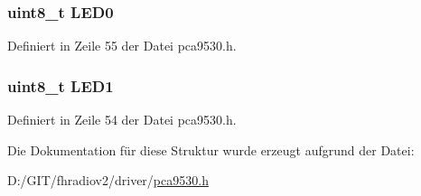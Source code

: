 \subsubsection[{L\+E\+D0}]{\setlength{\rightskip}{0pt plus 5cm}uint8\+\_\+t L\+E\+D0}\label{structpca9530__in_a698763138aab81826861fd602c87872b}


Definiert in Zeile 55 der Datei pca9530.\+h.

\hypertarget{structpca9530__in_a40e423e01a324e06ebc015b85a9d6b8e}{}
\subsubsection[{L\+E\+D1}]{\setlength{\rightskip}{0pt plus 5cm}uint8\+\_\+t L\+E\+D1}\label{structpca9530__in_a40e423e01a324e06ebc015b85a9d6b8e}


Definiert in Zeile 54 der Datei pca9530.\+h.



Die Dokumentation für diese Struktur wurde erzeugt aufgrund der Datei\+:\begin{DoxyCompactItemize}
\item 
D\+:/\+G\+I\+T/fhradiov2/driver/\hyperlink{pca9530_8h}{pca9530.\+h}\end{DoxyCompactItemize}
